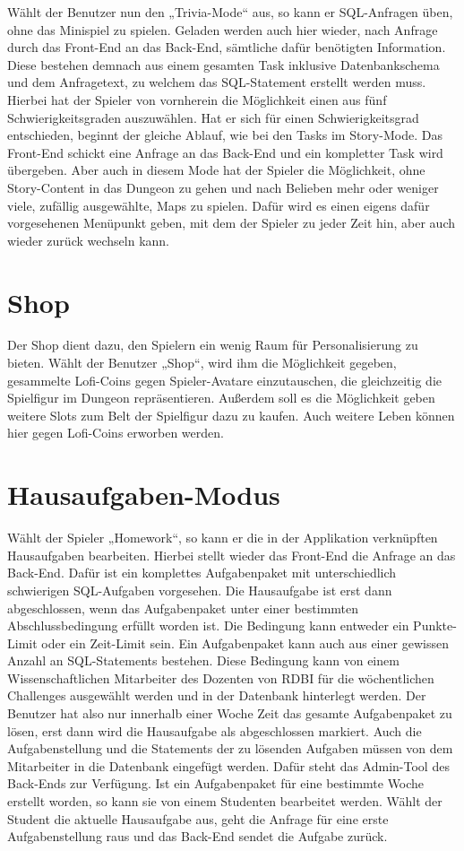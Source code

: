 W\"ahlt der Benutzer nun den „Trivia-Mode“ aus, so kann er SQL-Anfragen \"uben, ohne das Minispiel zu spielen. Geladen werden auch hier wieder, 
nach Anfrage durch das Front-End an das Back-End, s\"amtliche daf\"ur ben\"otigten Information. Diese bestehen demnach aus einem gesamten 
Task inklusive Datenbankschema und dem Anfragetext, zu welchem das SQL-Statement erstellt werden muss. Hierbei hat der Spieler von 
vornherein die M\"oglichkeit  einen aus f\"unf Schwierigkeitsgraden auszuw\"ahlen. Hat er sich f\"ur einen Schwierigkeitsgrad entschieden, beginnt 
der gleiche Ablauf, wie bei den Tasks im Story-Mode. Das Front-End schickt eine Anfrage an das Back-End und ein kompletter Task wird 
\"ubergeben. Aber auch in diesem Mode hat der Spieler die M\"oglichkeit, ohne Story-Content in das Dungeon zu gehen und nach Belieben mehr 
oder weniger viele, zuf\"allig ausgew\"ahlte, Maps zu spielen. Daf\"ur wird es einen eigens daf\"ur vorgesehenen Men\"upunkt  geben, mit dem der 
Spieler zu jeder Zeit hin, aber auch wieder zur\"uck wechseln kann.

\section{Shop}
Der Shop dient dazu, den Spielern ein wenig Raum f\"ur Personalisierung zu bieten. 
W\"ahlt der Benutzer „Shop“, wird ihm die M\"oglichkeit gegeben, gesammelte Lofi-Coins gegen Spieler-Avatare einzutauschen, die gleichzeitig die 
Spielfigur im Dungeon repr\"asentieren. Au{\ss}erdem soll es die M\"oglichkeit geben weitere Slots zum Belt der Spielfigur dazu zu kaufen. Auch
weitere Leben k\"onnen hier gegen Lofi-Coins erworben werden. 

\section{Hausaufgaben-Modus} 
W\"ahlt der Spieler „Homework“, so kann er die in der Applikation verkn\"upften Hausaufgaben bearbeiten. Hierbei stellt wieder das Front-End die 
Anfrage an das Back-End. Daf\"ur ist ein komplettes Aufgabenpaket mit unterschiedlich schwierigen SQL-Aufgaben vorgesehen. Die Hausaufgabe 
ist erst dann abgeschlossen, wenn das Aufgabenpaket unter einer bestimmten Abschlussbedingung erf\"ullt worden ist. Die Bedingung kann 
entweder ein Punkte-Limit oder ein Zeit-Limit sein. Ein Aufgabenpaket kann auch aus einer gewissen Anzahl an SQL-Statements bestehen.
Diese Bedingung kann von einem Wissenschaftlichen Mitarbeiter des Dozenten von RDBI f\"ur die w\"ochentlichen Challenges ausgew\"ahlt 
werden und in der Datenbank hinterlegt werden. Der Benutzer hat also nur innerhalb einer Woche Zeit das gesamte Aufgabenpaket zu l\"osen, 
erst dann wird die Hausaufgabe als abgeschlossen markiert.  Auch die Aufgabenstellung und die Statements der zu l\"osenden Aufgaben m\"ussen von dem 
Mitarbeiter in die Datenbank eingef\"ugt werden. Daf\"ur steht das Admin-Tool des Back-Ends zur Verf\"ugung. Ist ein Aufgabenpaket f\"ur eine 
bestimmte Woche erstellt worden, so kann sie von einem Studenten bearbeitet werden. W\"ahlt der Student die aktuelle Hausaufgabe aus, 
geht die Anfrage f\"ur eine erste Aufgabenstellung raus und das Back-End sendet die Aufgabe zur\"uck.

